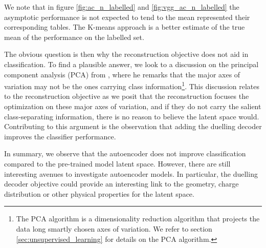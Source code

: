 We note that in figure \ref{fig:ac_n_labelled} and \ref{fig:vgg_ac_n_labelled} the asymptotic performance is not expected to tend to the mean represented their corresponding tables. The K-means approach is a better estimate of the true mean of the performance on the labelled set.

The obvious question is then why the reconstruction objective does not aid in classification. To find a plausible answer, we look to a discussion on the principal component analysis (PCA) from \citet{Jolliffe1982}, where he remarks that the major axes of variation may not be the ones carrying class information\footnote{The PCA algorithm is a dimensionality reduction algorithm that projects the data long smartly chosen axes of variation. We refer to section \ref{sec:unsupervised_learning} for details on the PCA algorithm. }. This discussion relates to the reconstruction objective as we posit that the reconstruction focuses the optimization on these major axes of variation, and if they do not carry the salient class-separating information, there is no reason to believe the latent space would. Contributing to this argument is the observation that adding the duelling decoder improves the classifier performance.

In summary, we observe that the autoencoder does not improve classification compared to the pre-trained model latent space. However, there are still interesting avenues to investigate autoencoder models. In particular, the duelling decoder objective could provide an interesting link to the geometry, charge distribution or other physical properties for the latent space.

